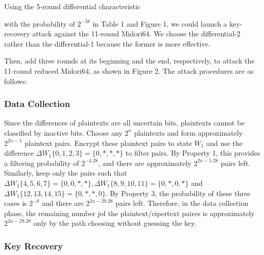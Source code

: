 \documentclass[journal=tosc,preprint]{iacrtrans}
\begin{document}
    Using the 5-round differential characteristic

    \begin{center}
    \end{center}
    with the probability of $2^{-58}$ in Table 1 and Figure 1, we could launch a key-recovery attack against the 11-round Midori64. We choose the differential-2 rather than the differential-1 because the former is more effective.

    Then, add three rounds at its beginning and the end, respectively, to attack the 11-round reduced Midori64, as shown in Figure 2. The attack procedures are as follows:

    \subsubsection{Data Collection}
    Since the differences of plaintexts are all uncertain bits, plaintexts cannot be classified by inactive bits. Choose any $2^n$ plaintexts and form approximately $2^{2n-1}$ plaintext pairs. Encrypt these plaintext pairs to state $W_1$ and use the difference $\Delta W_1\{0, 1, 2, 3\} = \{0, \ast, \ast, \ast\}$ to filter pairs. By Property 1, this provides a filtering probability of $2^{-4.28}$, and there are approximately $2^{2n-5.28}$ pairs left. Similarly, keep only the pairs such that $\Delta W_1 \{4, 5, 6, 7\} = \{0, 0, \ast, \ast \}, \Delta W_1 \{8, 9, 10, 11\} = \{0, \ast, 0, \ast \}$ and $\Delta W_1 \{12, 13, 14, 15\} = \{0, \ast, \ast, 0\}$. By Property 3, the probability of these three cases is $2^{-8}$ and there are $2^{2n - 29.28}$ pairs left. Therefore, in the data collection phase, the remaining number jof the plaintext/cipertext paires is approximately $2^{2n - 29.28}$ only by the path choosing without guessing the key.
    

    \subsubsection{Key Recovery}
\end{document}
